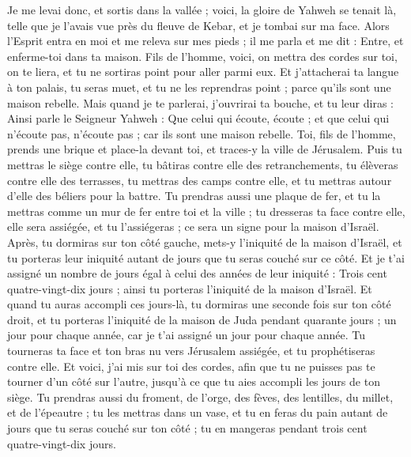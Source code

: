 \begin{multicols}{2}
Je me levai donc, et sortis dans la vallée ; voici, la gloire de Yahweh se tenait là, telle que je l'avais vue près du fleuve de Kebar, et je tombai sur ma face.
Alors l'Esprit entra en moi et me releva sur mes pieds ; il me parla et me dit : Entre, et enferme-toi dans ta maison.
Fils de l'homme, voici, on mettra des cordes sur toi, on te liera, et tu ne sortiras point pour aller parmi eux.
 Et j'attacherai ta langue à ton palais, tu seras muet, et tu ne les reprendras point ; parce qu'ils sont une maison  rebelle.
Mais quand je te parlerai, j'ouvrirai ta bouche, et tu leur diras : Ainsi parle le Seigneur Yahweh : Que celui qui écoute, écoute ; et que celui qui n'écoute pas, n'écoute pas ; car ils sont une maison rebelle.
\VerseOne{}Toi, fils de l'homme, prends une brique et place-la devant toi, et traces-y la ville de Jérusalem.
Puis tu mettras le siège contre elle, tu bâtiras contre elle des retranchements, tu élèveras contre elle des terrasses, tu mettras des camps contre elle, et tu mettras autour d'elle des béliers pour la battre.
Tu prendras aussi une plaque de fer, et tu la mettras comme un mur de fer entre toi et la ville ; tu dresseras ta face contre elle, elle sera assiégée, et tu l'assiégeras ; ce sera un signe pour la maison d'Israël.
Après, tu dormiras sur ton côté gauche, mets-y l'iniquité de la maison d'Israël, et tu porteras leur iniquité autant de jours que tu seras couché sur ce côté.
Et je t'ai assigné un nombre de jours égal à celui des années de leur iniquité : Trois cent quatre-vingt-dix jours ; ainsi tu porteras l'iniquité de la maison d'Israël.
Et quand tu auras accompli ces jours-là, tu dormiras une seconde fois sur ton côté droit, et tu porteras l'iniquité de la maison de Juda pendant quarante jours ; un jour pour chaque année, car je t'ai assigné un jour pour chaque année.
Tu tourneras ta face et ton bras nu vers Jérusalem assiégée, et tu prophétiseras contre elle.
Et voici, j'ai mis sur toi des cordes, afin que tu ne puisses pas te tourner d'un côté sur l'autre, jusqu'à ce que tu aies accompli les jours de ton siège.
Tu prendras aussi du froment, de l'orge, des fèves, des lentilles, du millet, et de l'épeautre ; tu les mettras dans un vase, et tu en feras du pain autant de jours que tu seras couché sur ton côté ; tu en mangeras pendant trois cent quatre-vingt-dix jours.

\end{multicols}
